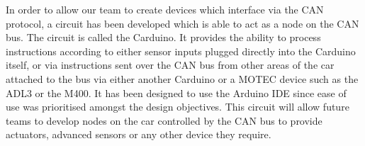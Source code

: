 In order to allow our team to create devices which interface via the CAN protocol, a circuit has been developed which is able to act as a node on the CAN bus. The circuit is called the Carduino. It provides the ability to process instructions according to either sensor inputs plugged directly into the Carduino itself, or via instructions sent over the CAN bus from other areas of the car attached to the bus via either another Carduino or a MOTEC device such as the ADL3 or the M400. It has been designed to use the Arduino IDE since ease of use was prioritised amongst the design objectives. This circuit will allow future teams to develop nodes on the car controlled by the CAN bus to provide actuators, advanced sensors or any other device they require.





